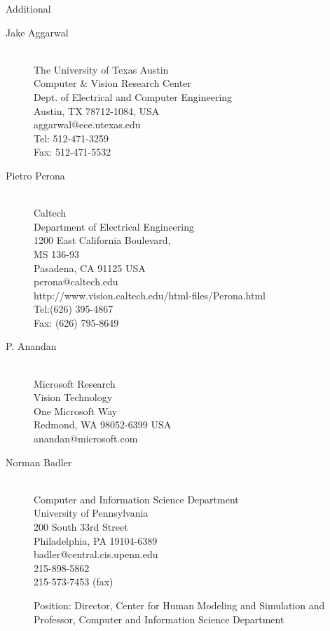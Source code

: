 \documentclass{gtcv}
\begin{document}
\centerline{Additional}

\begin{description}

\item[Jake Aggarwal]~\\
The University of Texas Austin \\
Computer \& Vision Research Center \\
Dept. of Electrical and Computer Engineering\\
Austin, TX 78712-1084, USA \\
aggarwal@ece.utexas.edu\\
Tel: 512-471-3259 \\
Fax: 512-471-5532


\item[Pietro Perona]~\\
Caltech \\
Department of Electrical Engineering\\
1200 East California Boulevard, \\
MS 136-93 \\
Pasadena, CA 91125 USA \\
perona@caltech.edu \\
http://www.vision.caltech.edu/html-files/Perona.html \\
Tel:(626) 395-4867 \\
Fax: (626) 795-8649

\item[P. Anandan]~\\
Microsoft Research\\
Vision Technology\\
One Microsoft Way \\
Redmond, WA 98052-6399 USA\\
anandan@microsoft.com\\

\item[Norman Badler]~\\
Computer and Information Science Department \\
University of Pennsylvania \\
200 South 33rd Street \\
Philadelphia, PA 19104-6389 \\
badler@central.cis.upenn.edu \\
215-898-5862 \\
215-573-7453 (fax)

\medskip
Position: Director, Center for Human Modeling and Simulation and
   Professor, Computer and Information Science Department


\end{description}
\end{document}
